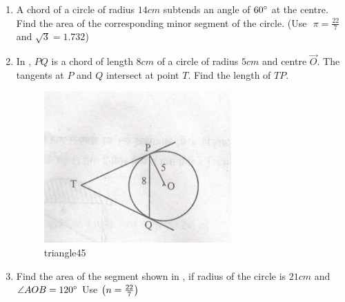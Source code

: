 \begin{enumerate}
\item A chord of a circle of radius $14 cm$ subtends an angle of $60\degree$ at the centre. Find the area of the corresponding minor segment of the circle.
({Use $\hspace{4pt}\pi=\frac{22}{7}$ and $\sqrt{3} = 1.732$})

\item In , $PQ$ is a chord of length $8 cm$ of a circle of radius $5 cm$ and centre $\vec{O}$. The tangents at $P$ and $Q$ intersect at point $T$. Find the length of $TP$.
\begin{figure}[H]                                             \centering
         \includegraphics[width=\columnwidth]{figs/i2.jpeg}
			\caption{triangle45}
			\label{fig:figure2345}

                \end{figure}
\item Find the area of the segment shown in , if radius of the circle is $21 cm$ and $\angle AOB = 120\degree$ Use $\left(n =\frac{22}{7}\right) $
\begin{figure}[H]                                     
\centering
	

\end{figure}
\end{enumerate}
